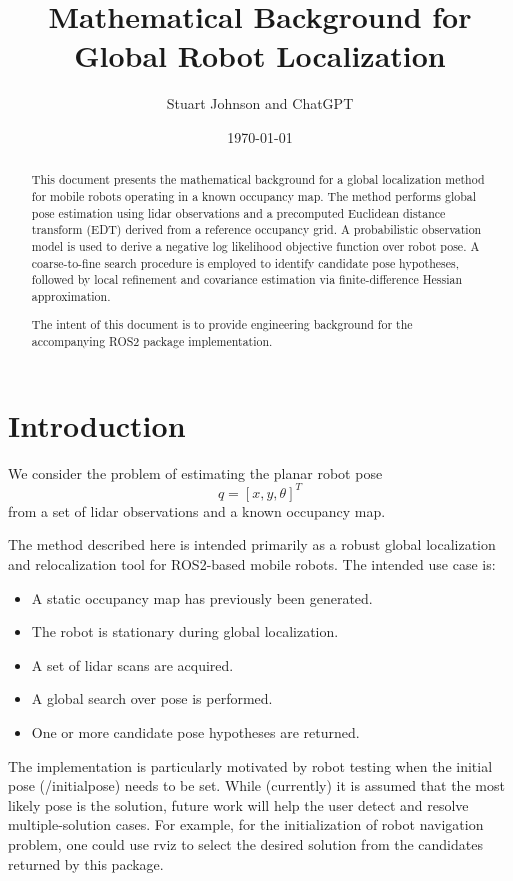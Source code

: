 \documentclass[11pt]{article}
\title{Mathematical Background for Global Robot Localization}
\author{Stuart Johnson and ChatGPT}
\date{\today}
\begin{document}
\maketitle

\begin{abstract}
This document presents the mathematical background for a global localization method for mobile robots operating in a known occupancy map. The method performs global pose estimation using lidar observations and a precomputed Euclidean distance transform (EDT) derived from a reference occupancy grid. A probabilistic observation model is used to derive a negative log likelihood objective function over robot pose. A coarse-to-fine search procedure is employed to identify candidate pose hypotheses, followed by local refinement and covariance estimation via finite-difference Hessian approximation.

The intent of this document is to provide engineering background for the accompanying ROS2 package implementation.
\end{abstract}

\section{Introduction}

We consider the problem of estimating the planar robot pose
\begin{equation}
q = [x, y, \theta]^T
\end{equation}
from a set of lidar observations and a known occupancy map.

The method described here is intended primarily as a robust global localization and relocalization tool for ROS2-based mobile robots. The intended use case is:
\begin{itemize}
    \item A static occupancy map has previously been generated.
    \item The robot is stationary during global localization.
    \item A set of lidar scans are acquired.
    \item A global search over pose is performed.
    \item One or more candidate pose hypotheses are returned.
\end{itemize}
The implementation is particularly motivated by robot testing when the initial pose (/initialpose) needs to be set. While (currently) it is assumed that the most likely pose is the solution, future work will help the user detect and resolve multiple-solution cases. For example, for the initialization of robot navigation problem, one could use rviz to select the desired solution from the candidates returned by this package.
\end{document}

